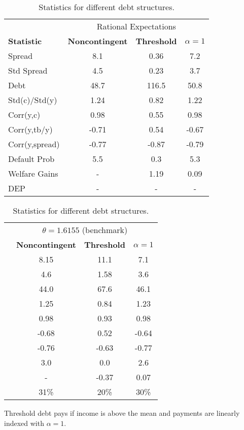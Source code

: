 \begin{table}[!hbtp]\centering\small
\caption{Statistics for different debt structures.}  \label{table:PP}
\begin{tabular}{@{}lccc@{}}\toprule
  & \multicolumn{3}{c}{Rational Expectations} \\\cmidrule{2-4}
\textbf{Statistic} & \textbf{Noncontingent} & \textbf{Threshold} & $\alpha = 1$\\\midrule
Spread                   & 8.1            & 0.36            & 7.2           \\
Std Spread               & 4.5            & 0.23            & 3.7            \\
Debt                     & 48.7           & 116.5           & 50.8           \\
Std(c)/Std(y)            & 1.24           & 0.82           & 1.22           \\
Corr(y,c)                & 0.98           & 0.55           & 0.98           \\
Corr(y,tb/y)             & -0.71          & 0.54           & -0.67          \\
Corr(y,spread)           & -0.77          & -0.87           & -0.79          \\
Default Prob             & 5.5            & 0.3            & 5.3            \\
Welfare Gains            & -              & 1.19           & 0.09           \\
DEP                      &    -           &    -           &    -          \\
  \bottomrule
\end{tabular}%
\begin{tabular}{@{}lccc@{}}\toprule
& \multicolumn{3}{c}{$\theta = 1.6155$ (benchmark)} \\\cmidrule{2-4}
& \textbf{Noncontingent} & \textbf{Threshold} & $\alpha = 1$ \\\midrule
& 8.15           & 11.1           & 7.1           \\
& 4.6            & 1.58            & 3.6            \\
& 44.0           & 67.6           & 46.1           \\
& 1.25           & 0.84           & 1.23           \\
& 0.98           & 0.93           & 0.98           \\
& -0.68          & 0.52           & -0.64          \\
& -0.76          & -0.63          & -0.77          \\
& 3.0            & 0.0            & 2.6            \\
& -              & -0.37          & 0.07           \\
& 31\%           & 20\%           & 30\%          \\ 
\bottomrule 
\end{tabular}
\begin{tablenotes1}
  Threshold debt pays if income is above the mean and payments are linearly indexed with $\alpha = 1$.
\end{tablenotes1}
\end{table}
  
